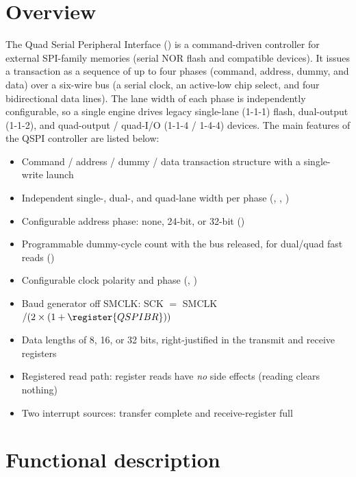 \section{Overview}

The Quad Serial Peripheral Interface () is a command-driven controller for external SPI-family memories (serial NOR flash and compatible devices). It issues a transaction as a sequence of up to four phases (command, address, dummy, and data) over a six-wire bus (a serial clock, an active-low chip select, and four bidirectional data lines). The lane width of each phase is independently configurable, so a single engine drives legacy single-lane (1-1-1) flash, dual-output (1-1-2), and quad-output / quad-I/O (1-1-4 / 1-4-4) devices. The main features of the QSPI controller are listed below:

\begin{itemize}
	\item Command / address / dummy / data transaction structure with a single-write launch
	\item Independent single-, dual-, and quad-lane width per phase (, , )
	\item Configurable address phase: none, 24-bit, or 32-bit ()
	\item Programmable dummy-cycle count with the bus released, for dual/quad fast reads ()
	\item Configurable clock polarity and phase (, )
	\item Baud generator off SMCLK: SCK $=$ SMCLK $/ (2 \times (1 + \register{QSPIBR}))$
	\item Data lengths of 8, 16, or 32 bits, right-justified in the transmit and receive registers
	\item Registered read path: register reads have \emph{no} side effects (reading  clears nothing)
	\item Two interrupt sources: transfer complete and receive-register full
\end{itemize}

\section{Functional description}

